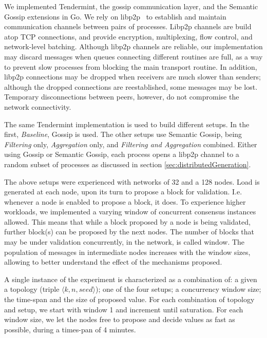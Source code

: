 We implemented Tendermint, the gossip communication layer, and the Semantic Gossip extensions in Go.
We rely on libp2p~\cite{libp2p} to establish and maintain communication
channels between pairs of processes.
Libp2p channels are build atop TCP connections, and provide encryption,
multiplexing, flow control, and network-level batching.
Although libp2p channels are reliable, our implementation may discard messages when queues connecting different routines are full, as a way to prevent slow
processes from blocking the main transport routine.
In addition, libp2p connections may be dropped when receivers are much slower
than senders; although the dropped connections are reestablished, some messages may be lost. Temporary disconnections between peers, however, do not compromise the network connectivity.

The same Tendermint implementation is used to build different setups. In the first, \emph{Baseline}, Gossip is used. The other setups use Semantic Gossip, being \emph{Filtering} only, \emph{Aggregation} only, and 
\emph{Filtering and Aggregation} combined.
Either using Gossip or Semantic Gossip, each process opens a libp2p channel to a random subset of processes as discussed in section \ref{sec:distributedGeneration}.

The above setups were experienced with networks of 32 and a 128 nodes.
%
Load is generated at each node, upon its turn to propose a 
block for validation. I.e. whenever a node is enabled to propose a block, it does.
%
To experience higher workloads, we implemented a varying window of concurrent consensus instances allowed.
This means that while a block proposed by a node is being validated, further 
block(s) can be proposed by the next nodes.
The number of blocks that may be under validation concurrently, in the network, 
is called window.   The population of messages in intermediate nodes increases with the window sizes, allowing to better understand the effect of the mechanisms proposed.

A single instance of the experiment is characterized as a combination of: 
a given a topology (triple $\langle k, n, seed \rangle$);
one of the four setups; 
a concurrency window size; 
the time-span and the size of proposed value. 
For each combination of topology and setup, we start with window 1 and 
increment until saturation.  For each window size, 
we let the nodes free to propose and decide values as fast as possible, during a times-pan of 4 minutes.


